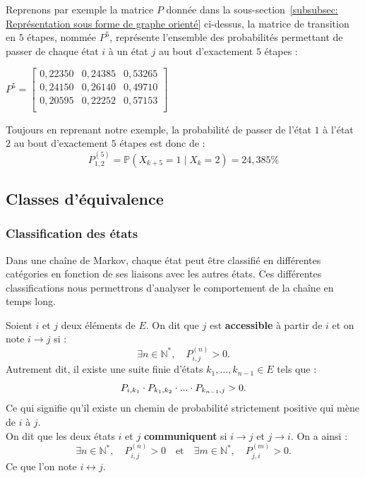 \documentclass{article}
\begin{document}
\begin{tcolorbox}[colback=white,colframe=yellow!80!black,title=Exemple, breakable]
Reprenons par exemple la matrice $P$ donnée dans la sous-section~\ref{subsubsec: Représentation sous forme de graphe orienté} ci-dessus, la matrice de transition en $5$ étapes, nommée $P^{5}$, représente l'ensemble des probabilités permettant de passer de chaque état $i$ à un état $j$ au bout d'exactement $5$ étapes :
\begin{center}
$
P^{5} = \begin{bmatrix}
0,22350 & 0,24385 & 0,53265 \\
0,24150 & 0,26140 & 0,49710 \\
0,20595 & 0,22252 & 0,57153 \\
\end{bmatrix}
$
\end{center}
Toujours en reprenant notre exemple, la probabilité de passer de l'état $1$ à l'état $2$ au bout d'exactement $5$ étapes est donc de :
\[
P_{1,2}^{(5)} = \mathbb{P}(X_{k+5} = 1 \mid X_k = 2) = 24,385\%
\]
\end{tcolorbox}

\newpage
\subsection{Classes d'équivalence}

\subsubsection{Classification des états}
\label{subsubsec: Les différents types d'états}

Dans une chaîne de Markov, chaque état peut être classifié en différentes catégories en fonction de ses liaisons avec les autres états. 
Ces différentes classifications nous permettrons d'analyser le comportement de la chaîne en temps long. 

\begin{tcolorbox}[colback=white,colframe=red!80!black,title=Accessibilité et communication]
Soient $i$ et $j$ deux éléments de $E$. On dit que $j$ est \textbf{accessible} à partir de $i$ et on note $i \to j$ si :
\[
\exists n \in \mathbb{N}^{*}, \quad P_{i,j}^{(n)} > 0.
\]
Autrement dit, il existe une suite finie d'états $k_1, \dots, k_{n-1} \in E$ tels que :
\[
P_{i,k_1} \cdot P_{k_1,k_2}\cdot ... \cdot P_{k_{n-1},j} > 0. \\
\]
Ce qui signifie qu'il existe un chemin de probabilité strictement positive qui mène de $i$ à $j$. \\

On dit que les deux états $i$ et $j$ \textbf{communiquent} si $i \rightarrow j$ et $j \rightarrow i$. On a ainsi :
\[
\exists n \in \mathbb{N}^{*}, \quad P_{i,j}^{(n)} > 0 \quad \text{et} \quad \exists m \in \mathbb{N}^{*}, \quad P_{j,i}^{(m)} > 0.
\]
Ce que l'on note $i \leftrightarrow j$.
\end{tcolorbox}
\end{document}
